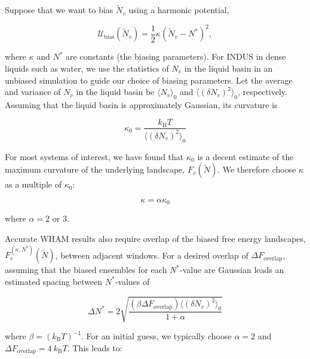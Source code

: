\documentclass[11pt,notitlepage]{article}
\newcommand{\kB}{k_{\text{B}}}
\begin{document}

Suppose that we want to bias $\tilde{N}_v$ using a harmonic potential,

\begin{equation} \label{eqn:harmonicbias}
	\mathcal{U}_{\text{bias}}(\tilde{N}_v) = \frac{1}{2} \kappa (\tilde{N}_v - N^*)^2,
\end{equation}

\noindent where $\kappa$ and $N^*$ are constants (the biasing parameters). For INDUS in dense liquids such as water, we use the statistics of $N_v$ in the liquid basin in an unbiased simulation to guide our choice of biasing parameters. Let the average and variance of $N_v$ in the liquid basin be $\langle N_v \rangle_0$ and $\langle (\delta N_v)^2 \rangle_0$, respectively. Assuming that the liquid basin is approximately Gaussian, its curvature is

\begin{equation}
	\kappa_0 = \frac{k_{\text{B}} T}{\langle (\delta N_v)^2 \rangle_0}
\end{equation}


For most systems of interest, we have found that $\kappa_0$ is a decent estimate of the maximum curvature of the underlying landscape, $F_v(\tilde{N})$. We therefore choose $\kappa$ as a multiple of $\kappa_0$:

\begin{equation}
	\kappa = \alpha \kappa_0
\end{equation}

\noindent where $\alpha = 2$ or $3$. 


Accurate WHAM results also require overlap of the biased free energy landscapes, $F_v^{(\kappa, N^*)}(\tilde{N})$, between adjacent windows. For a desired overlap of $ \Delta F_{\text{overlap}}$, assuming that the biased ensembles for each $N^*$-value are Gaussian leads an estimated spacing between $N^*$-values of

\begin{equation}
	\Delta N^* = 2 \sqrt{ \frac{(\beta \Delta F_{\text{overlap}}) \langle (\delta N_v)^2 \rangle_0}{1 + \alpha} }
\end{equation}


\noindent where $\beta = (\kB T)^{-1}$. For an initial guess, we typically choose $\alpha = 2$ and $\Delta F_{\text{overlap}} = 4 \ k_{\text{B}} T$. This leads to:
\end{document}

